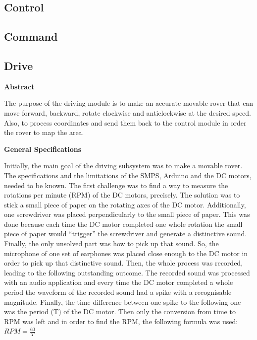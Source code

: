 \documentclass[a4paper]{article}
\begin{document}
\subsection{Control}

\subsection{Command}

\subsection{Drive}

\begin{center}
\textbf{Abstract}
\end{center}
The purpose of the driving module is to make an accurate movable rover that can 
move forward, backward, rotate clockwise and anticlockwise at the desired speed.
Also, to process coordinates and send them back to the control module in order 
the rover to map the area.

\textbf{General Specifications}

Initially, the main goal of the driving subsystem was to make a movable rover. 
The specifications and the limitations of the SMPS, Arduino and the DC motors, 
needed to be known.  The first challenge was to find a way to measure the 
rotations per minute (RPM) of the DC motors, precisely. The solution was to 
stick a small piece of paper on the rotating axes of the DC motor. Additionally,
one screwdriver was placed perpendicularly to the small piece of paper. This was
done because each time the DC motor completed one whole rotation the small piece
of paper would ``trigger'' the screwdriver and generate a distinctive sound.
Finally, the only unsolved part was how to pick up that sound. So, the 
microphone of one set of earphones was placed close enough to the DC motor in order 
to pick up that distinctive sound. Then, the whole process was recorded, leading 
to the following outstanding outcome. The recorded sound was processed with an 
audio application and every time the DC motor completed a whole period the 
waveform of the recorded sound had a spike with a recognisable magnitude. 
Finally, the time difference between one spike to the following one was the 
period (T) of the DC motor. 
Then only the conversion from time to RPM was left and in order to find the RPM,
the following formula was used: \( RPM=\frac{60}{T} \) 

\end{document}
